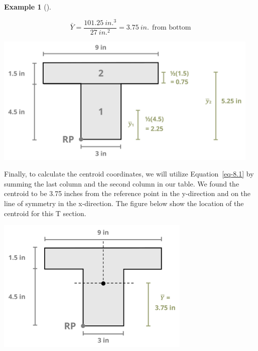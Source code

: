 \documentclass[
  letterpaper,
  DIV=11,
  numbers=noendperiod]{scrreprt}
\theoremstyle{definition}
\newtheorem{example}{Example}[chapter]
\theoremstyle{remark}
\begin{document}
\begin{tcolorbox}
\begin{example}[]
\begin{tcolorbox}
\[
\bar{Y}=\frac{101.25{~in.^3}}{27{~in.^2}}=3.75{~in.} ~~\text{from bottom}
\]

\begin{center}
\includegraphics[width=5.01042in,height=\textheight]{images/CH 8 PNGs/example 8.1 part 3.png}
\end{center}

Finally, to calculate the centroid coordinates, we will utilize
Equation~\ref{eq-8.1} by summing the last column and the second column
in our table. We found the centroid to be 3.75 inches from the reference
point in the y-direction and on the line of symmetry in the x-direction.
The figure below show the location of the centroid for this T section.

\begin{center}
\includegraphics[width=3.64583in,height=\textheight]{images/CH 8 PNGs/example 8.1 part 4.png}
\end{center}

\end{tcolorbox}

\end{example}

\end{tcolorbox}
\end{document}
